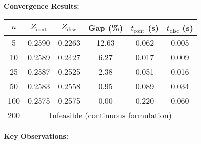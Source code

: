 \documentclass{article}
\begin{document}
\textbf{Convergence Results:}

\begin{center}
\begin{tabular}{cccccc}
\hline
$n$ & $Z_{\text{cont}}$ & $Z_{\text{disc}}$ & Gap (\%) & $t_{\text{cont}}$ (s) & $t_{\text{disc}}$ (s) \\
\hline
5 & 0.2590 & 0.2263 & 12.63 & 0.062 & 0.005 \\
10 & 0.2589 & 0.2427 & 6.27 & 0.017 & 0.009 \\
25 & 0.2587 & 0.2525 & 2.38 & 0.051 & 0.016 \\
50 & 0.2583 & 0.2558 & 0.95 & 0.089 & 0.034 \\
100 & 0.2575 & 0.2575 & 0.00 & 0.220 & 0.060 \\
200 & \multicolumn{5}{c}{Infeasible (continuous formulation)} \\
\hline
\end{tabular}
\end{center}

\textbf{Key Observations:}
\end{document}
